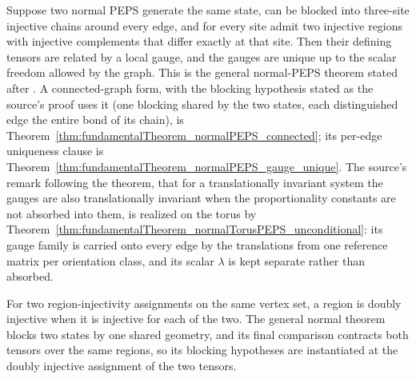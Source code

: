 \begin{theorem}%
    \label{thm:fundamentalTheorem_normalPEPS}
    \notready
    Suppose two normal PEPS generate the same state, can be blocked into
    three-site injective chains around every edge, and for every site admit
    two injective regions with injective complements that differ exactly at
    that site. Then their defining tensors are related by a local gauge, and
    the gauges are unique up to the scalar freedom allowed by the graph. This
    is the general normal-PEPS theorem stated after
    \cite[Theorem~3]{Molnar2018NormalPEPS}.
    A connected-graph form, with the blocking hypothesis stated as the
    source's proof uses it (one blocking shared by the two states, each
    distinguished edge the entire bond of its chain), is
    Theorem~\ref{thm:fundamentalTheorem_normalPEPS_connected}; its per-edge
    uniqueness clause is
    Theorem~\ref{thm:fundamentalTheorem_normalPEPS_gauge_unique}.
    The source's remark following the theorem, that for a translationally
    invariant system the gauges are also translationally invariant when the
    proportionality constants are not absorbed into them, is realized on the
    torus by
    Theorem~\ref{thm:fundamentalTheorem_normalTorusPEPS_unconditional}: its
    gauge family is carried onto every edge by the translations from one
    reference matrix per orientation class, and its scalar $\lambda$ is kept
    separate rather than absorbed.
\end{theorem}

\begin{definition}%
    \label{def:peps_regionInjectivityDataPair}
    \leanok
    For two region-injectivity assignments on the same vertex set, a region is
    doubly injective when it is injective for each of the two.  The general
    normal theorem blocks two states by one shared geometry, and its final
    comparison contracts both tensors over the same regions, so its blocking
    hypotheses are instantiated at the doubly injective assignment of the two
    tensors.
\end{definition}

